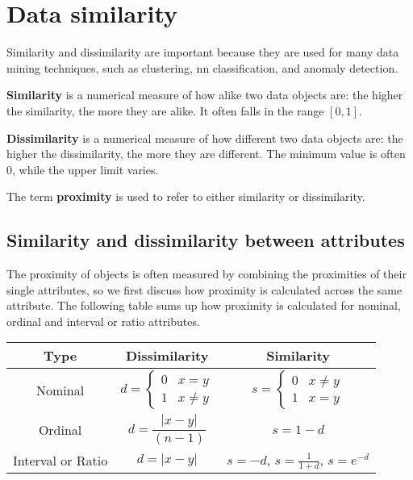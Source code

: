 \chapter{Data similarity}

Similarity and dissimilarity are important because they are used for many data mining techniques, such as clustering, nn classification, and anomaly detection.

\textbf{Similarity} is a numerical measure of how alike two data objects are: the higher the similarity, the more they are alike. It often falls in the range $[0,1]$.

\textbf{Dissimilarity} is a numerical measure of how different two data objects are: the higher the dissimilarity, the more they are different. The minimum value is often $0$, while the upper limit varies.

The term \textbf{proximity} is used to refer to either similarity or dissimilarity.

\section{Similarity and dissimilarity between attributes}

The proximity of objects is often measured by combining the proximities of their single attributes, so we first discuss how proximity is calculated across the same attribute.
The following table sums up how proximity is calculated for nominal, ordinal and interval or ratio attributes.

\begin{table}[h]
    \centering
    \begin{tabular}{c|c|c}
        Type & Dissimilarity & Similarity \\
        \hline
        Nominal & $d=\begin{cases}
                    0 & x = y \\
                    1 & x \neq y
                    \end{cases}$ & $s=\begin{cases}
                    0 & x \neq y \\
                    1 & x = y
                    \end{cases}$ \\
        \hline
        Ordinal & $d = \dfrac{|x-y|}{(n-1)}$ & $s = 1-d$\\
        \hline
        Interval or Ratio & $d = |x - y|$ & $s = -d$, $s=\frac{1}{1+d}$, $s = e^{-d}$\\
    \end{tabular}
\end{table}

